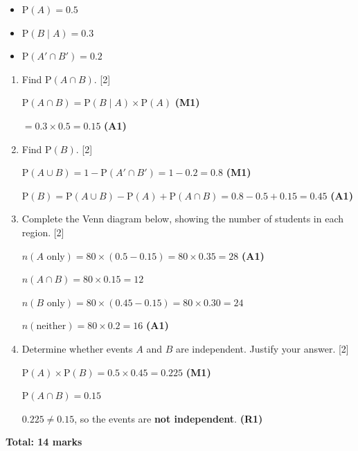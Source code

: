 \documentclass[12pt, twoside]{article}
\begin{document}
\begin{enumerate}[itemsep=0.15cm]
\begin{itemize}[itemsep=0.1cm]
  \item $\mathrm{P}(A) = 0.5$
  \item $\mathrm{P}(B \mid A) = 0.3$
  \item $\mathrm{P}(A' \cap B') = 0.2$
\end{itemize}

\begin{enumerate}[itemsep=0.3cm]
  \item Find $\mathrm{P}(A \cap B)$. \hfill [2]

  $\mathrm{P}(A \cap B) = \mathrm{P}(B \mid A) \times \mathrm{P}(A)$ \hfill \textbf{(M1)}

  $= 0.3 \times 0.5 = 0.15$ \hfill \textbf{(A1)}

  \item Find $\mathrm{P}(B)$. \hfill [2]

  $\mathrm{P}(A \cup B) = 1 - \mathrm{P}(A' \cap B') = 1 - 0.2 = 0.8$ \hfill \textbf{(M1)}

  $\mathrm{P}(B) = \mathrm{P}(A \cup B) - \mathrm{P}(A) + \mathrm{P}(A \cap B)
    = 0.8 - 0.5 + 0.15 = 0.45$ \hfill \textbf{(A1)}

  \item Complete the Venn diagram below, showing the number
        of students in each region. \hfill [2]

  $n(A \text{ only}) = 80 \times (0.5 - 0.15) = 80 \times 0.35 = 28$ \hfill \textbf{(A1)}

  $n(A \cap B) = 80 \times 0.15 = 12$

  $n(B \text{ only}) = 80 \times (0.45 - 0.15) = 80 \times 0.30 = 24$

  $n(\text{neither}) = 80 \times 0.2 = 16$ \hfill \textbf{(A1)}

\begin{center}
\end{center}

  \item Determine whether events $A$ and $B$ are independent.
        Justify your answer. \hfill [2]

  $\mathrm{P}(A) \times \mathrm{P}(B) = 0.5 \times 0.45 = 0.225$ \hfill \textbf{(M1)}

  $\mathrm{P}(A \cap B) = 0.15$

  $0.225 \neq 0.15$, so the events are \textbf{not independent}. \hfill \textbf{(R1)}
\end{enumerate}

\bigskip
\noindent\textbf{Total: 14 marks}

\end{enumerate}
\end{document}
